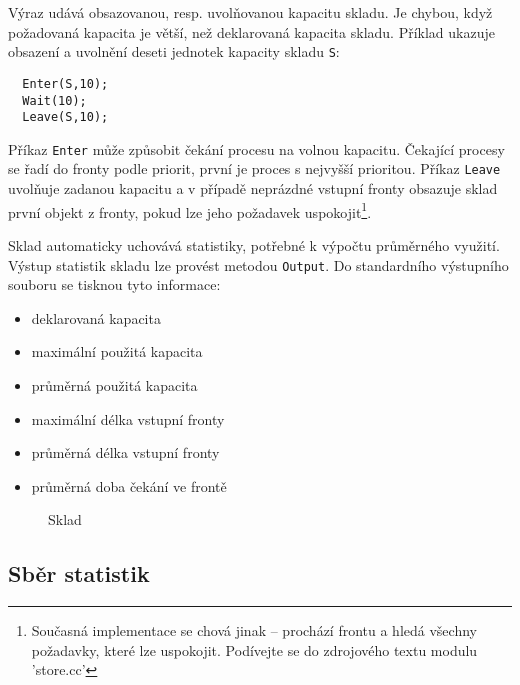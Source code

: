 \documentclass[a4paper]{article}
\begin{document}
Výraz udává obsazovanou, resp. uvolňovanou kapacitu skladu. Je
chybou, když požadovaná kapacita je větší, než deklarovaná
kapacita skladu. Příklad ukazuje obsazení a uvolnění deseti
jednotek kapacity skladu \verb|S|:

\begin{verbatim}
  Enter(S,10);
  Wait(10);
  Leave(S,10);
\end{verbatim}

Příkaz \verb|Enter| může způsobit čekání procesu na volnou kapacitu.
Čekající procesy se řadí do fronty podle priorit, první je
proces s nejvyšší prioritou. Příkaz \verb|Leave| uvolňuje zadanou
kapacitu a v případě neprázdné vstupní fronty obsazuje sklad
první objekt z fronty, pokud lze jeho požadavek uspokojit\footnote{Současná
implementace se chová jinak -- prochází frontu a hledá všechny požadavky,
které lze uspokojit. Podívejte se do zdrojového textu modulu 'store.cc'}.

Sklad automaticky uchovává statistiky, potřebné k výpočtu
průměrného využití. Výstup statistik skladu lze provést metodou
\verb|Output|. Do standardního výstupního souboru se tisknou tyto
informace:

\begin{itemize}
\item  deklarovaná kapacita
\item  maximální použitá kapacita
\item  průměrná použitá kapacita
\item  maximální délka vstupní fronty
\item  průměrná délka vstupní fronty
\item  průměrná doba čekání ve frontě
\end{itemize}

%
\begin{figure}[ht]
  \begin{center}
    \caption{Sklad}
    \label{o3}
  \end{center}
\end{figure}



\subsection{Sběr statistik}
\end{document}
